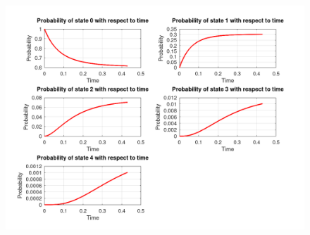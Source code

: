\documentclass[a4paper]{article}
\begin{document}
\begin{figure}[H]
	\begin{center}
		\includegraphics[width=\textwidth]{files/3bv.png}
	\end{center}
\end{figure}
\end{document}
